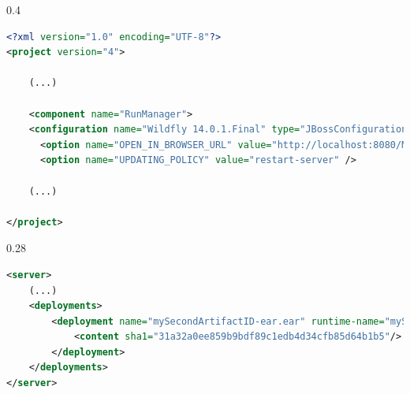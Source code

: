 \documentclass[aspectratio=1610,english]{beamer} %
\begin{document}
	\begin{lrbox}{\configurationBox}
		\begin{varwidth}{0.4\textwidth}
			\fontsize{3}{5} \selectfont
				\begin{lstlisting}[style=myCustomStyle, language=XML,
  					morekeywords={soap, ns2,
    				xs:schema, 
    				xs:element, 
    				xs:complexType, 
    				xs:sequence, 
    				xs:attribute},
    				basicstyle=\ttfamily,
					columns=fullflexible,
					showstringspaces=false,
					commentstyle=\color{gray}\upshape, 
					belowskip=-20pt,
					aboveskip=0pt ]
<?xml version="1.0" encoding="UTF-8"?>
<project version="4">

	(...)
	
    <component name="RunManager">
    <configuration name="Wildfly 14.0.1.Final" type="JBossConfiguration" factoryName="Local" APPLICATION_SERVER_NAME="JBoss 14.0.1.Final" ALTERNATIVE_JRE_ENABLED="false">
      <option name="OPEN_IN_BROWSER_URL" value="http://localhost:8080/MySecondProjectName-web/" />
      <option name="UPDATING_POLICY" value="restart-server" />
	
	(...)
	
</project>							\end{lstlisting}
		\end{varwidth}
	\end{lrbox}
	
	\begin{lrbox}{\configurationStandaloneErrorBox}
		\begin{varwidth}{0.28\textwidth}
			\fontsize{3}{5} \selectfont
				\begin{lstlisting}[style=myCustomStyle, language=XML,
  					morekeywords={soap, ns2,
    				xs:schema, 
    				xs:element, 
    				xs:complexType, 
    				xs:sequence, 
    				xs:attribute},
    				basicstyle=\ttfamily,
					columns=fullflexible,
					showstringspaces=false,
					commentstyle=\color{gray}\upshape, 
					belowskip=-20pt,
					aboveskip=0pt ]
<server>	
	(...)
	<deployments>
        <deployment name="mySecondArtifactID-ear.ear" runtime-name="mySecondArtifactID-ear.ear">
            <content sha1="31a32a0ee859b9bdf89c1edb4d34cfb85d64b1b5"/>
        </deployment>
    </deployments>
</server>							\end{lstlisting}
		\end{varwidth}
	\end{lrbox}
	
\end{document}
